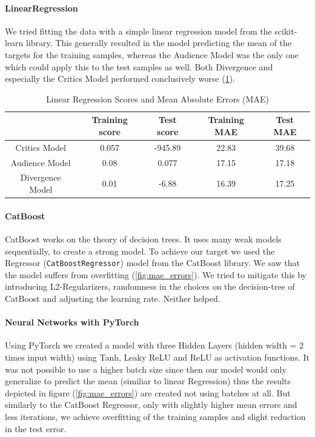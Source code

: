 \documentclass{article}
\begin{document}
    \paragraph{LinearRegression}
    We tried fitting the data with a simple linear regression model from the scikit-learn library. This generally resulted in the model predicting the mean of the targets for the training samples, whereas the Audience Model was the only one which could apply this to the test samples as well. Both Divergence and especially the Critics Model performed conclusively worse (\ref{tab:lin_regression}).
    \begin{table}[h]
        \centering
        \begin{tabular}{c||c|c|c|c}
             & Training score & Test score & Training MAE & Test MAE \\
            \hline
            Critics Model       & 0.057 & -945.89   & 22.83     & 39.68 \\
            \hline
            Audience Model      & 0.08  & 0.077     & 17.15     & 17.18 \\
            \hline
            Divergence Model    & 0.01  & -6.88     & 16.39     & 17.25
        \end{tabular}
        \caption{Linear Regression Scores and Mean Absolute Errors (MAE)}
        \label{tab:lin_regression}
    \end{table}
    \vspace{-8pt}
    \paragraph{CatBoost}
    CatBoost works on the theory of decision trees. It uses many weak models sequentially, to create a strong model. To achieve our target we used the Regressor (\texttt{CatBoostRegressor}) model from the CatBoost library.
    We saw that the model suffers from overfitting (\ref{fig:mae_errors}). We tried to mitigate this by introducing L2-Regularizers, randomness in the choices on the decision-tree of CatBoost and adjusting the learning rate. Neither helped. 
    
    \paragraph{Neural Networks with PyTorch}
    Using PyTorch we created a model with three Hidden Layers (hidden width = 2 times input width) using Tanh, Leaky ReLU and ReLU as activation functions. It was not possible to use a higher batch size since then our model would only generalize to predict the mean (similiar to linear Regression) thus the results depicted in figure (\ref{fig:mae_errors}) are created not using batches at all. But similarly to the CatBoost Regressor, only with slightly higher mean errors and less iterations, we achieve overfitting of the training samples and slight reduction in the test error. 
    
\end{document}

